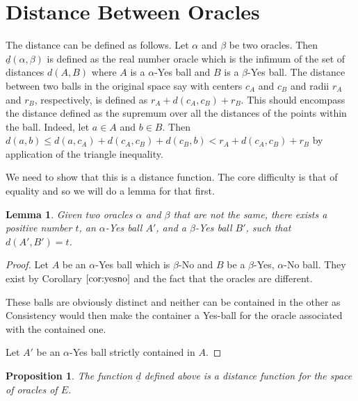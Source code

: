 \documentclass[12pt]{article}
\newtheorem{lemma}{Lemma}[section]
\newtheorem{proposition}{Proposition}[section]
\begin{document}
\section{Distance Between Oracles}

The distance can be defined as follows. Let $\alpha$ and $\beta$ be two oracles. Then $\underline{d}(\alpha,\beta)$ is defined as the real number oracle which is the infimum of the set of distances $d(A, B)$ where $A$ is a $\alpha$-Yes ball and $B$ is a $\beta$-Yes ball. The distance between two balls in the original space say with centers $c_A$ and $c_B$ and radii $r_A$ and $r_B$, respectively, is defined as $r_A + d(c_A,c_B) + r_B$. This should encompass the distance defined as the supremum over all the distances of the points within the ball. Indeed, let $a \in A$ and $b\in B$. Then $d(a, b) \leq d(a,c_A) + d(c_A,c_B) + d(c_B,b) < r_A + d(c_A,c_B) + r_B$ by application of the triangle inequality. 

We need to show that this is a distance function. The core difficulty is that of equality and so we will do a lemma for that first. 

\begin{lemma}
    Given two oracles $\alpha$ and $\beta$ that are not the same, there exists a positive number $t$, an $\alpha$-Yes ball $A'$, and a $\beta$-Yes ball $B'$, such that $d(A', B') = t$.
\end{lemma}

\begin{proof}
     Let $A$ be an $\alpha$-Yes ball which is $\beta$-No and $B$ be a $\beta$-Yes, $\alpha$-No ball. They exist by Corollary $\ref{cor:yesno}$ and the fact that the oracles are different. 

     These balls are obviously distinct and neither can be contained in the other as Consistency would then make the container a Yes-ball for the oracle associated with the contained one. 

     Let $A'$ be an $\alpha$-Yes ball strictly contained in $A$. 

     
\end{proof}


\begin{proposition}
    The function $\underline{d}$ defined above is a distance function for the space of oracles of $E$. 
\end{proposition}
\end{document}
